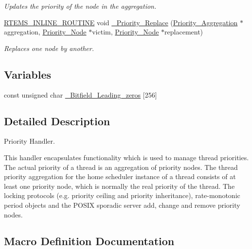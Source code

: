 \begin{DoxyCompactItemize}
\begin{DoxyCompactList}\small\item\em Updates the priority of the node in the aggregation. \end{DoxyCompactList}\item 
\mbox{\hyperlink{group__RTEMSScoreBaseDefs_gac216239df231d5dbd15e3520b0b9313f}{R\+T\+E\+M\+S\+\_\+\+I\+N\+L\+I\+N\+E\+\_\+\+R\+O\+U\+T\+I\+NE}} void \mbox{\hyperlink{group__RTEMSScorePriority_ga5571db1b8c4f7e5a5aa4ce4398e55f6a}{\+\_\+\+Priority\+\_\+\+Replace}} (\mbox{\hyperlink{structPriority__Aggregation}{Priority\+\_\+\+Aggregation}} $\ast$aggregation, \mbox{\hyperlink{structPriority__Node}{Priority\+\_\+\+Node}} $\ast$victim, \mbox{\hyperlink{structPriority__Node}{Priority\+\_\+\+Node}} $\ast$replacement)
\begin{DoxyCompactList}\small\item\em Replaces one node by another. \end{DoxyCompactList}\end{DoxyCompactItemize}
\subsection*{Variables}
\begin{DoxyCompactItemize}
\item 
const unsigned char \mbox{\hyperlink{group__RTEMSScorePriority_gae7a955bc5864ff213306e21ec75ee0a1}{\+\_\+\+Bitfield\+\_\+\+Leading\+\_\+zeros}} \mbox{[}256\mbox{]}
\end{DoxyCompactItemize}


\subsection{Detailed Description}
Priority Handler. 

This handler encapsulates functionality which is used to manage thread priorities. The actual priority of a thread is an aggregation of priority nodes. The thread priority aggregation for the home scheduler instance of a thread consists of at least one priority node, which is normally the real priority of the thread. The locking protocols (e.\+g. priority ceiling and priority inheritance), rate-\/monotonic period objects and the P\+O\+S\+IX sporadic server add, change and remove priority nodes. 

\subsection{Macro Definition Documentation}
\mbox{\label{group__RTEMSScorePriority_ga2711e6c0b0a209b78f35ad5f76db56f3}} 
